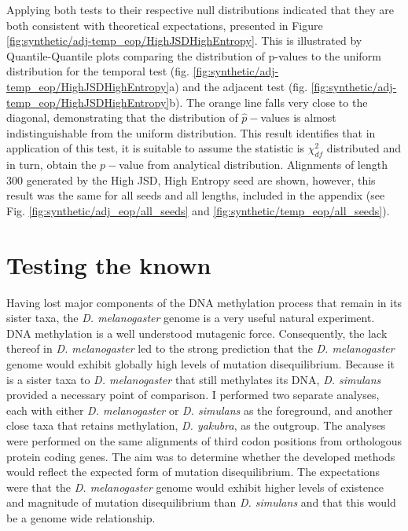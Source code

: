 Applying both tests to their respective null distributions indicated that they are both consistent with theoretical expectations, presented in Figure \ref{fig:synthetic/adj-temp_eop/HighJSDHighEntropy}. This is illustrated by Quantile-Quantile plots comparing the distribution of p-values to the uniform distribution for the temporal test (fig. \ref{fig:synthetic/adj-temp_eop/HighJSDHighEntropy}a) and the adjacent test (fig. \ref{fig:synthetic/adj-temp_eop/HighJSDHighEntropy}b). The orange line falls very close to the diagonal, demonstrating that the distribution of $\hat p-$values is almost indistinguishable from the uniform distribution.  This result identifies that in application of this test, it is suitable to assume the statistic is $\chi^2_{df}$ distributed and in turn, obtain the $p-$value from analytical distribution. Alignments of length 300 generated by the High JSD, High Entropy seed are shown, however, this result was the same for all seeds and all lengths, included in the appendix (see Fig. \ref{fig:synthetic/adj_eop/all_seeds} and \ref{fig:synthetic/temp_eop/all_seeds}).



\section*{Testing the known}

Having lost major components of the DNA methylation process that remain in its sister taxa, the \textit{D. melanogaster} genome is a very useful natural experiment. DNA methylation is a well understood mutagenic force. Consequently, the lack thereof in
\textit{D. melanogaster} led to the strong prediction that the \textit{D. melanogaster} genome would exhibit globally high levels of mutation disequilibrium. Because it is a sister taxa to \textit{D. melanogaster} that still methylates its DNA, \textit{D. simulans} provided a necessary point of comparison. I performed two separate analyses, each with either \textit{D. melanogaster} or \textit{D. simulans} as the foreground, and another close taxa that retains methylation, \textit{D. yakubra}, as the outgroup. The analyses were performed on the same alignments of third codon positions from orthologous protein coding genes. The aim was to determine whether the developed methods would reflect the expected form of mutation disequilibrium. The expectations were that the \textit{D. melanogaster} genome would exhibit higher levels of existence and magnitude of mutation disequilibrium than \textit{D. simulans} and that this would be a genome wide relationship. 


